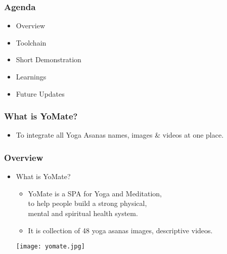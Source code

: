 \documentclass[12pt]{beamer}
\author{Archana Kumari}
\title{}
\subtitle{}
\date{November 2021}
\begin{document}
\begin{frame}
\maketitle
\end{frame}

\begin{frame}
    \frametitle{Agenda} 
             \begin{itemize}
             \item {Overview}
             \item {Toolchain}
             \item {Short Demonstration}
             \item {Learnings}
             \item {Future Updates}
             \end{itemize}         
\end{frame} 

\begin{frame}
    \frametitle{What is YoMate?}
    \begin{itemize}
        \item {To integrate all Yoga Asanas names, images \& videos at one place.}
            
	\end{itemize}       
\end{frame}  

\begin{frame}
    \frametitle{Overview}
    \begin{itemize}
        \item What is YoMate? 
             \begin{itemize}
             \item {YoMate is a SPA for Yoga and Meditation,\\ to help people build a strong physical,\\ mental and spiritual health system.}
             \item{It is collection of 48 yoga asanas images, descriptive
videos.}

             \end{itemize}  
             \begin {center}
              \texttt{[image: yomate.jpg]} 
              \end{center}   
\end{itemize}       
\end{frame}   
           
\end{document}
